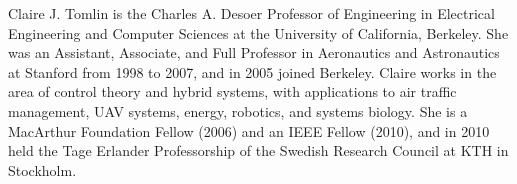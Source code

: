 \vspace{-6cm}
\begin{IEEEbiography}{Claire J. Tomlin} is the Charles A. Desoer Professor of Engineering in Electrical Engineering and Computer Sciences at the University of California, Berkeley. She was an Assistant, Associate, and Full Professor in Aeronautics and Astronautics at Stanford from 1998 to 2007, and in 2005 joined Berkeley. Claire works in the area of control theory and hybrid systems, with applications to air traffic management, UAV systems, energy, robotics, and systems biology. She is a MacArthur Foundation Fellow (2006) and an IEEE Fellow (2010), and in 2010 held the Tage Erlander Professorship of the Swedish Research Council at KTH in Stockholm.
\end{IEEEbiography}